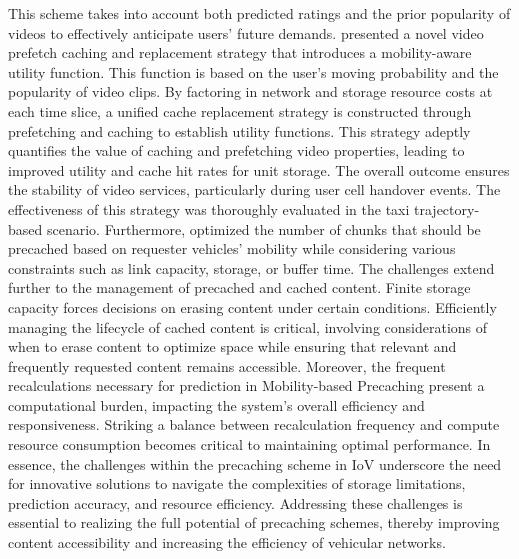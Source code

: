 \documentclass[journal]{IEEEtran}
\begin{document}
This scheme takes into account both predicted ratings and the prior popularity of videos to effectively anticipate users' future demands.
\cite{Liu2018} presented a novel video prefetch caching and replacement strategy that introduces a mobility-aware utility function.
This function is based on the user's moving probability and the popularity of video clips.
By factoring in network and storage resource costs at each time slice, a unified cache replacement strategy is constructed through prefetching and caching to establish utility functions.
This strategy adeptly quantifies the value of caching and prefetching video properties, leading to improved utility and cache hit rates for unit storage.
The overall outcome ensures the stability of video services, particularly during user cell handover events.
The effectiveness of this strategy was thoroughly evaluated in the taxi trajectory-based scenario.
Furthermore, \cite{Ahani2018, AlNagar2019, Liang2018} optimized the number of chunks that should be precached based on requester vehicles' mobility while considering various constraints such as link capacity, storage, or buffer time.
The challenges extend further to the management of precached and cached content.
Finite storage capacity forces decisions on erasing content under certain conditions.
Efficiently managing the lifecycle of cached content is critical, involving considerations of when to erase content to optimize space while ensuring that relevant and frequently requested content remains accessible.
Moreover, the frequent recalculations necessary for prediction in Mobility-based Precaching present a computational burden, impacting the system's overall efficiency and responsiveness.
Striking a balance between recalculation frequency and compute resource consumption becomes critical to maintaining optimal performance.
In essence, the challenges within the precaching scheme in IoV underscore the need for innovative solutions to navigate the complexities of storage limitations, prediction accuracy, and resource efficiency.
Addressing these challenges is essential to realizing the full potential of precaching schemes, thereby improving content accessibility and increasing the efficiency of vehicular networks.
\end{document}
